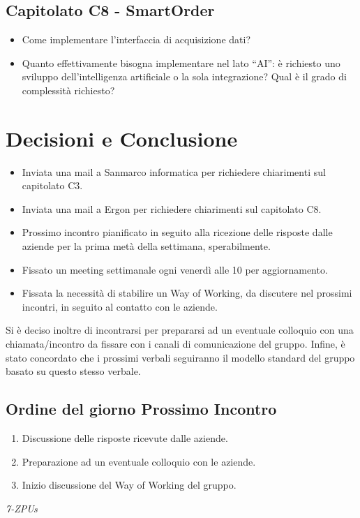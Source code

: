 \documentclass[a4paper,12pt]{article}
\begin{document}
\subsection{Capitolato C8 - SmartOrder}
\begin{itemize}
    \item Come implementare l'interfaccia di acquisizione dati?
    \item Quanto effettivamente bisogna implementare nel lato “AI”: è richiesto uno
          sviluppo dell’intelligenza artificiale o la sola integrazione? Qual è il grado
          di complessità richiesto?
\end{itemize}

\vspace{0.5cm}
\section{Decisioni e Conclusione}
\begin{itemize}
    \item Inviata una mail a Sanmarco informatica per richiedere chiarimenti sul
          capitolato C3.
    \item Inviata una mail a Ergon per richiedere chiarimenti sul capitolato C8.
    \item Prossimo incontro pianificato in seguito alla ricezione delle risposte dalle
          aziende per la prima metà della settimana, sperabilmente.
    \item Fissato un meeting settimanale ogni venerdì alle 10 per aggiornamento.
    \item Fissata la necessità di stabilire un Way of Working, da discutere nel prossimi
          incontri, in seguito al contatto con le aziende.
\end{itemize}
Si è deciso inoltre di incontrarsi per prepararsi ad un eventuale colloquio con una chiamata/incontro da fissare con i canali di comunicazione del gruppo.
Infine, è stato concordato che i prossimi verbali seguiranno il modello standard del gruppo basato su questo stesso verbale.

\subsection{Ordine del giorno Prossimo Incontro}
\begin{enumerate}
    \item Discussione delle risposte ricevute dalle aziende.
    \item Preparazione ad un eventuale colloquio con le aziende.
    \item Inizio discussione del Way of Working del gruppo.
\end{enumerate}

\vfill
\begin{flushright}
    \textit{7-ZPUs}
\end{flushright}
\end{document}
